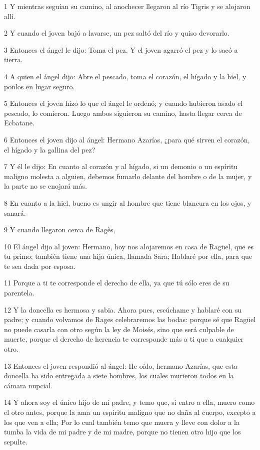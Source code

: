 \par 1 Y mientras seguían su camino, al anochecer llegaron al río Tigris y se alojaron allí.
\par 2 Y cuando el joven bajó a lavarse, un pez saltó del río y quiso devorarlo.
\par 3 Entonces el ángel le dijo: Toma el pez. Y el joven agarró el pez y lo sacó a tierra.
\par 4 A quien el ángel dijo: Abre el pescado, toma el corazón, el hígado y la hiel, y ponlos en lugar seguro.
\par 5 Entonces el joven hizo lo que el ángel le ordenó; y cuando hubieron asado el pescado, lo comieron. Luego ambos siguieron su camino, hasta llegar cerca de Ecbatane.
\par 6 Entonces el joven dijo al ángel: Hermano Azarías, ¿para qué sirven el corazón, el hígado y la gallina del pez?
\par 7 Y él le dijo: En cuanto al corazón y al hígado, si un demonio o un espíritu maligno molesta a alguien, debemos fumarlo delante del hombre o de la mujer, y la parte no se enojará más.
\par 8 En cuanto a la hiel, bueno es ungir al hombre que tiene blancura en los ojos, y sanará.
\par 9 Y cuando llegaron cerca de Ragès,
\par 10 El ángel dijo al joven: Hermano, hoy nos alojaremos en casa de Ragüel, que es tu primo; también tiene una hija única, llamada Sara; Hablaré por ella, para que te sea dada por esposa.
\par 11 Porque a ti te corresponde el derecho de ella, ya que tú sólo eres de su parentela.
\par 12 Y la doncella es hermosa y sabia. Ahora pues, escúchame y hablaré con su padre; y cuando volvamos de Rages celebraremos las bodas: porque sé que Ragüel no puede casarla con otro según la ley de Moisés, sino que será culpable de muerte, porque el derecho de herencia te corresponde más a ti que a cualquier otro.
\par 13 Entonces el joven respondió al ángel: He oído, hermano Azarías, que esta doncella ha sido entregada a siete hombres, los cuales murieron todos en la cámara nupcial.
\par 14 Y ahora soy el único hijo de mi padre, y temo que, si entro a ella, muero como el otro antes, porque la ama un espíritu maligno que no daña al cuerpo, excepto a los que ven a ella; Por lo cual también temo que muera y lleve con dolor a la tumba la vida de mi padre y de mi madre, porque no tienen otro hijo que los sepulte.
